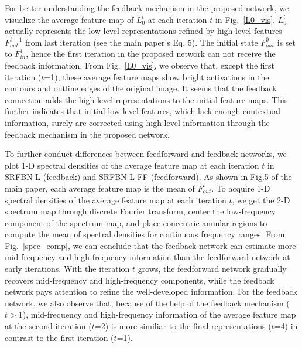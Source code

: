 \documentclass[10pt,twocolumn,letterpaper]{article}
\begin{document}
For better understanding the feedback mechanism in the proposed network, we visualize the average feature map of $L_{0}^{t}$ at each iteration $t$ in Fig.~\ref{L0_vis}. $L_{0}^{t}$ actually represents the low-level representations refined by high-level features $F_{out}^{t-1}$ from last iteration (see the main paper's Eq. 5). The initial state $F_{out}^{0}$ is set to $F_{in}^{1}$, hence the first iteration in the proposed network can not receive the feedback information. From Fig.~\ref{L0_vis}, we observe that, except the first iteration ($t$=1), these average feature maps show bright activations in the contours and outline edges of the original image. It seems that the feedback connection adds the high-level representations to the initial feature maps. This further indicates that initial low-level features, which lack enough contextual information, surely are corrected using high-level information through the feedback mechanism in the proposed network. 

To further conduct differences between feedforward and feedback networks, we plot 1-D spectral densities of the average feature map at each iteration $t$ in SRFBN-L (feedback) and SRFBN-L-FF (feedforward). As shown in Fig.5 of the main paper, each average feature map is the mean of $F_{out}^{t}$. To acquire 1-D spectral densities of the average feature map at each iteration $t$, we get the 2-D spectrum map through discrete Fourier transform, center the low-frequency component of the spectrum map, and place concentric annular regions to compute the mean of spectral densities for continuous frequency ranges. From Fig.~\ref{spec_comp}, we can conclude that the feedback network can estimate more mid-frequency and high-frequency information than the feedforward network at early iterations. With the iteration $t$ grows, the feedforward network gradually recovers mid-frequency and high-frequency components, while the feedback network pays attention to refine the well-developed information. For the feedback network, we also observe that,  because of the help of the feedback mechanism ($t>$1), mid-frequency and high-frequency information of the average feature map at the second iteration ($t$=2) is more similiar to the final representations ($t$=4) in contrast to the first iteration ($t$=1).
\end{document}
